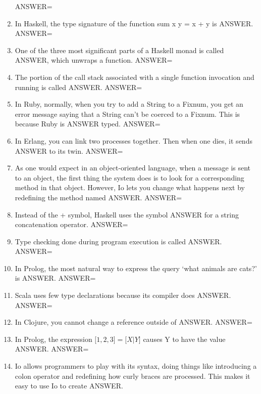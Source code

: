 \documentclass{exam}
\begin{document}
\begin{enumerate}
ANSWER=
\item In Haskell, the type signature of the function sum x y = x + y is ANSWER.\newline
ANSWER=
\item One of the three most significant parts of a Haskell monad is called ANSWER, which unwraps a function.\newline
ANSWER=
\item The portion of the call stack associated with a single function invocation and running is called ANSWER.\newline
ANSWER=
\item In Ruby, normally, when you try to add a String to a Fixnum, you get an error message saying that a String can't be coerced to a Fixnum.  This is because Ruby is ANSWER typed.\newline
ANSWER=
\item In Erlang, you can link two processes together.  Then when one dies, it sends ANSWER to its twin.\newline
ANSWER=
\item As one would expect in an object-oriented language, when a message is sent to an object, the first thing the system does is to look for a corresponding method in that object.  However, Io lets you change what happens next by redefining the method named ANSWER.\newline
ANSWER=
\item Instead of the +  symbol, Haskell uses the symbol ANSWER for a string concatenation operator.\newline
ANSWER=
\item Type checking done during program execution is called ANSWER.\newline
ANSWER=
\item In Prolog, the most natural way to express the query `what animals are cats?' is ANSWER.\newline
ANSWER=
\item Scala uses few type declarations because its compiler does ANSWER.\newline
ANSWER=
\item In Clojure, you cannot change a reference outside of ANSWER.\newline
ANSWER=
\item In Prolog, the expression $\lbrack 1, 2, 3\rbrack = \lbrack X | Y\rbrack$ causes Y to have the value ANSWER.\newline
ANSWER=
\item Io allows programmers to play with its syntax, doing things like introducing a colon operator and redefining how curly braces are processed.  This makes it easy to use Io to create ANSWER.\newline

\end{enumerate}
\end{document}
